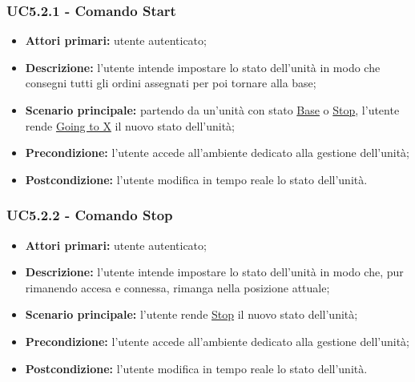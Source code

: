         \subsubsection{UC5.2.1 - Comando Start}
        \begin{itemize}
            \item \textbf{Attori primari:} utente autenticato;
            \item \textbf{Descrizione:} l'utente intende impostare lo stato dell'unità in modo che consegni tutti gli ordini assegnati per poi tornare alla base;
            \item \textbf{Scenario principale:} partendo da un'unità con stato \underline{Base} o \underline{Stop}, l'utente rende \underline{Going to X} il nuovo stato dell'unità;
            \item \textbf{Precondizione:} l'utente accede all'ambiente dedicato alla gestione dell'unità;
            \item \textbf{Postcondizione:} l'utente modifica in tempo reale lo stato dell'unità.
        \end{itemize}

        \subsubsection{UC5.2.2 - Comando Stop}
        \begin{itemize}
            \item \textbf{Attori primari:} utente autenticato;
            \item \textbf{Descrizione:} l'utente intende impostare lo stato dell'unità in modo che, pur rimanendo accesa e connessa, rimanga nella posizione attuale;
            \item \textbf{Scenario principale:} l'utente rende \underline{Stop} il nuovo stato dell'unità;
            \item \textbf{Precondizione:} l'utente accede all'ambiente dedicato alla gestione dell'unità;
            \item \textbf{Postcondizione:} l'utente modifica in tempo reale lo stato dell'unità.
        \end{itemize}

